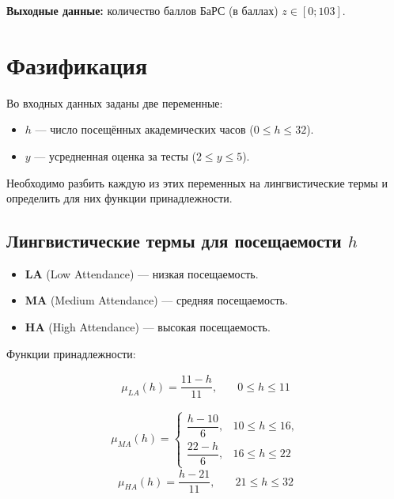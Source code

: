 \documentclass{article}
\begin{document}
\textbf{Выходные данные:} количество баллов БаРС (в баллах) $z \in [0;103]$.

\section{Фазификация}

Во входных данных заданы две переменные:
\begin{itemize}
    \item $h$ — число посещённых академических часов ($0 \le h \le 32$).
    \item $y$ — усредненная оценка за тесты ($2 \le y \le 5$).
\end{itemize}

Необходимо разбить каждую из этих переменных на лингвистические термы и определить для них функции принадлежности.

\subsection{Лингвистические термы для посещаемости $h$}

\begin{itemize}
    \item \textbf{LA} (Low Attendance) — низкая посещаемость.
    \item \textbf{MA} (Medium Attendance) — средняя посещаемость.
    \item \textbf{HA} (High Attendance) — высокая посещаемость.
\end{itemize}

Функции принадлежности: 

\begin{align*}
\mu_{LA}(h) = \dfrac{11 -h}{11}, &\quad 0 \le h \le 11
\end{align*}

\[
\mu_{MA}(h) =
\begin{cases}
\dfrac{h - 10}{6}, & 10 \le h \le 16,\\
\dfrac{22 - h}{6}, & 16 \le h \le 22
\end{cases}
\]
\begin{align*}
\mu_{HA}(h) = \dfrac{h - 21}{11}, &\quad 21 \le h \le 32
\end{align*}
\end{document}
